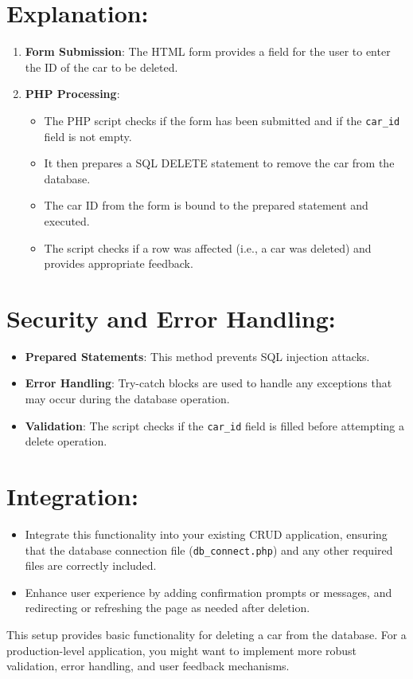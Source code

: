 \documentclass[11pt]{article}
\begin{document}
\section{Explanation:}
\label{sec:org9137f5d}
\begin{enumerate}
\item \textbf{Form Submission}: The HTML form provides a field for the user to
enter the ID of the car to be deleted.

\item \textbf{PHP Processing}:

\begin{itemize}
\item The PHP script checks if the form has been submitted and if the
\texttt{car\_id} field is not empty.
\item It then prepares a SQL DELETE statement to remove the car from the
database.
\item The car ID from the form is bound to the prepared statement and
executed.
\item The script checks if a row was affected (i.e., a car was deleted)
and provides appropriate feedback.
\end{itemize}
\end{enumerate}

\section{Security and Error Handling:}
\label{sec:orga2955ba}
\begin{itemize}
\item \textbf{Prepared Statements}: This method prevents SQL injection attacks.
\item \textbf{Error Handling}: Try-catch blocks are used to handle any exceptions
that may occur during the database operation.
\item \textbf{Validation}: The script checks if the \texttt{car\_id} field is filled before
attempting a delete operation.
\end{itemize}

\section{Integration:}
\label{sec:org39c5f88}
\begin{itemize}
\item Integrate this functionality into your existing CRUD application,
ensuring that the database connection file (\texttt{db\_connect.php}) and any
other required files are correctly included.
\item Enhance user experience by adding confirmation prompts or messages,
and redirecting or refreshing the page as needed after deletion.
\end{itemize}

This setup provides basic functionality for deleting a car from the
database. For a production-level application, you might want to
implement more robust validation, error handling, and user feedback
mechanisms.
\end{document}
